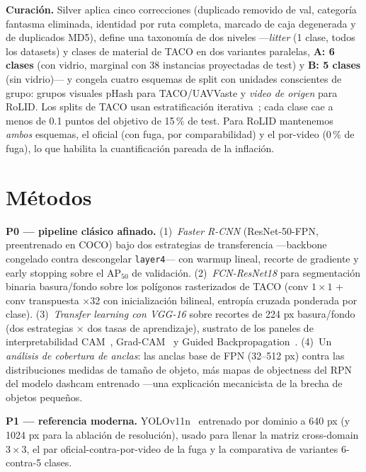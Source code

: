 \documentclass[conference]{IEEEtran}
\begin{document}
\textbf{Curación.} Silver aplica cinco correcciones (duplicado removido de val,
categoría fantasma eliminada, identidad por ruta completa, marcado de caja
degenerada y de duplicados MD5), define una taxonomía de dos niveles
---\emph{litter} (1 clase, todos los datasets) y clases de material de TACO en
dos variantes paralelas, \textbf{A: 6 clases} (con vidrio, marginal con 38
instancias proyectadas de test) y \textbf{B: 5 clases} (sin vidrio)--- y congela
cuatro esquemas de split con unidades conscientes de grupo: grupos visuales
pHash para TACO/UAVVaste y \emph{video de origen} para RoLID. Los splits de TACO
usan estratificación iterativa~\cite{sechidis}; cada clase cae a menos de 0.1
puntos del objetivo de 15\,\% de test. Para RoLID mantenemos \emph{ambos}
esquemas, el oficial (con fuga, por comparabilidad) y el por-video (0\,\% de
fuga), lo que habilita la cuantificación pareada de la inflación.

\section{Métodos}
\label{sec:methods}

\textbf{P0 --- pipeline clásico afinado.}
(1)~\emph{Faster R-CNN} (ResNet-50-FPN, preentrenado en COCO) bajo dos
estrategias de transferencia ---backbone congelado contra descongelar
\texttt{layer4}--- con warmup lineal, recorte de gradiente y early stopping
sobre el AP$_{50}$ de validación.
(2)~\emph{FCN-ResNet18} para segmentación binaria basura/fondo sobre los
polígonos rasterizados de TACO (conv $1\times1$ + conv transpuesta $\times$32
con inicialización bilineal, entropía cruzada ponderada por clase).
(3)~\emph{Transfer learning con VGG-16} sobre recortes de 224 px basura/fondo
(dos estrategias $\times$ dos tasas de aprendizaje), sustrato de los paneles de
interpretabilidad CAM~\cite{cam}, Grad-CAM~\cite{gradcam} y Guided
Backpropagation~\cite{guidedbp}.
(4)~Un \emph{análisis de cobertura de anclas}: las anclas base de FPN
(32--512 px) contra las distribuciones medidas de tamaño de objeto, más mapas de
objectness del RPN del modelo dashcam entrenado ---una explicación mecanicista
de la brecha de objetos pequeños.

\textbf{P1 --- referencia moderna.} YOLOv11n~\cite{yolo11} entrenado por dominio
a 640 px (y 1024 px para la ablación de resolución), usado para llenar la matriz
cross-domain $3\times3$, el par oficial-contra-por-video de la fuga y la
comparativa de variantes 6-contra-5 clases.
\end{document}
